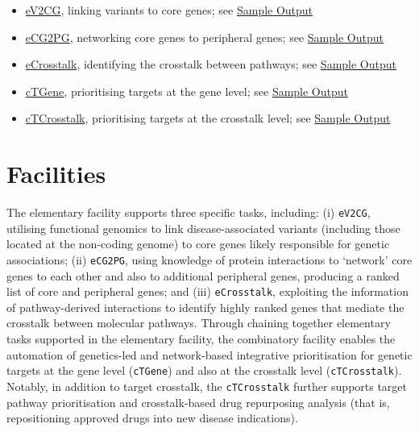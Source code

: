 \documentclass[
  oneside]{book}
\begin{document}
\begin{itemize}
\item
  \protect\hyperlink{ev2cg}{eV2CG}, linking variants to core genes; see \href{http://www.genetictargets.com/app/examples/_tmp_RMD_eV2CG.html}{Sample Output}
\item
  \protect\hyperlink{ecg2pg}{eCG2PG}, networking core genes to peripheral genes; see \href{http://www.genetictargets.com/app/examples/_tmp_RMD_eCG2PG.html}{Sample Output}
\item
  \protect\hyperlink{ecrosstalk}{eCrosstalk}, identifying the crosstalk between pathways; see \href{http://www.genetictargets.com/app/examples/_tmp_RMD_eCrosstalk.html}{Sample Output}
\item
  \protect\hyperlink{ctgene}{cTGene}, prioritising targets at the gene level; see \href{http://www.genetictargets.com/app/examples/_tmp_RMD_cTGene.html}{Sample Output}
\item
  \protect\hyperlink{ctcrosstalk}{cTCrosstalk}, prioritising targets at the crosstalk level; see \href{http://www.genetictargets.com/app/examples/_tmp_RMD_cTCrosstalk.html}{Sample Output}
\end{itemize}

\hypertarget{facilities}{%
\chapter{Facilities}\label{facilities}}

The elementary facility supports three specific tasks, including: (i) \texttt{eV2CG}, utilising functional genomics to link disease-associated variants (including those located at the non-coding genome) to core genes likely responsible for genetic associations; (ii) \texttt{eCG2PG}, using knowledge of protein interactions to `network' core genes to each other and also to additional peripheral genes, producing a ranked list of core and peripheral genes; and (iii) \texttt{eCrosstalk}, exploiting the information of pathway-derived interactions to identify highly ranked genes that mediate the crosstalk between molecular pathways. Through chaining together elementary tasks supported in the elementary facility, the combinatory facility enables the automation of genetics-led and network-based integrative prioritisation for genetic targets at the gene level (\texttt{cTGene}) and also at the crosstalk level (\texttt{cTCrosstalk}). Notably, in addition to target crosstalk, the \texttt{cTCrosstalk} further supports target pathway prioritisation and crosstalk-based drug repurposing analysis (that is, repositioning approved drugs into new disease indications).
\end{document}
